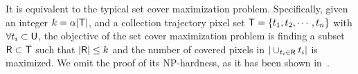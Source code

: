 It is equivalent to the typical set cover maximization problem.
Specifically, given an integer $k = \alpha |\mathsf{T}|$, and a collection trajectory pixel set $\mathsf{T} = \{t_1, t_2, \cdots, t_n \}$ with $\forall t_i \subset \mathsf{U}$,
the objective of the set cover maximization problem is finding a subset $\mathsf{R} \subset \mathsf{T}$ such that $|\mathsf{R}| \leq k$ and the number of covered pixels in $|\cup_{t_i \in \mathsf{R}} t_i|$ is maximized.
We omit the proof of its NP-hardness, as it has been shown in~\cite{setcover}.





